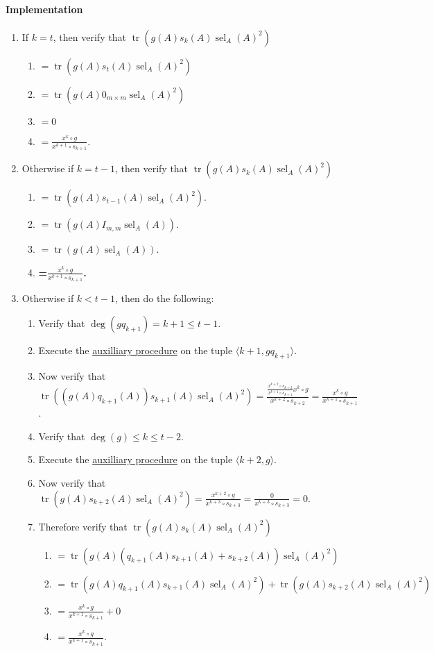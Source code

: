 \documentclass[twocolumn]{article}
\DeclareMathOperator{\tr}{tr}
\DeclareMathOperator{\sel}{sel}
\begin{document}
				\paragraph{Implementation}
					\begin{enumerate}
						\item If $k=t$, then verify that $\tr(g(A)s_k(A)\sel_A(A)^2)$
						\begin{enumerate}
							\item $=\tr(g(A)s_t(A)\sel_A(A)^2)$
							\item $=\tr(g(A)0_{m\times m}\sel_A(A)^2)$
							\item $=0$
							\item $=\frac{x^k\circ g}{x^{k+1}\circ s_{k+1}}$.
						\end{enumerate}
						\item Otherwise if $k=t-1$, then verify that $\tr(g(A)s_k(A)\sel_A(A)^2)$
						\begin{enumerate}
							\item $=\tr(g(A)s_{t-1}(A)\sel_A(A)^2)$.
							\item $=\tr(g(A)I_{m,m}\sel_A(A))$.
							\item $=\tr(g(A)\sel_A(A))$.
							\item \textbf{=$\frac{x^k\circ g}{x^{k+1}\circ s_{k+1}}$.}
						\end{enumerate}
						\item Otherwise if $k<t-1$, then do the following:
						\begin{enumerate}
							\item Verify that $\deg(gq_{k+1})=k+1\le t-1$.
							\item Execute the \hyperref[sec:procedure 73 auxilliary procedure]{auxilliary procedure} on the tuple $\langle k+1, gq_{k+1}\rangle$.
							\item Now verify that $\tr((g(A)q_{k+1}(A))s_{k+1}(A)\sel_A(A)^2)=\frac{\frac{x^{k+2}\circ s_{k+2}}{x^{k+1}\circ s_{k+1}}x^k\circ g}{x^{k+2}\circ s_{k+2}}=\frac{x^k\circ g}{x^{k+1}\circ s_{k+1}}$.
							\item Verify that $\deg(g)\le k\le t-2$.
							\item Execute the \hyperref[sec:procedure 73 auxilliary procedure]{auxilliary procedure} on the tuple $\langle k+2,g\rangle$.
							\item Now verify that $\tr(g(A)s_{k+2}(A)\sel_A(A)^2)=\frac{x^{k+2}\circ g}{x^{k+3}\circ{s_{k+3}}}=\frac{0}{x^{k+3}\circ{s_{k+3}}}=0$.
							\item Therefore verify that $\tr(g(A)s_k(A)\sel_A(A)^2)$
							\begin{enumerate}
								\item $=\tr(g(A)(q_{k+1}(A)s_{k+1}(A)+s_{k+2}(A))\sel_A(A)^2)$
								\item $=\tr(g(A)q_{k+1}(A)s_{k+1}(A)\sel_A(A)^2)+\tr(g(A)s_{k+2}(A)\sel_A(A)^2)$
								\item $=\frac{x^k\circ g}{x^{k+1}\circ s_{k+1}}+0$
								\item $=\frac{x^k\circ g}{x^{k+1}\circ s_{k+1}}$.
							\end{enumerate}
						\end{enumerate}
					\end{enumerate}
\end{document}

